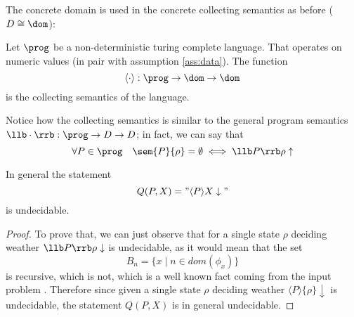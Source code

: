 The concrete domain is used in the concrete collecting semantics as
before (\(D \cong \dom\)):

\begin{definition}\label{def:collecting}
  Let \(\prog\) be a non-deterministic turing complete language. That
  operates on numeric values (in pair with assumption
  \ref{ass:data}). The function \[\langle \cdot \rangle : \prog \to
  \dom \to \dom\] is the collecting semantics of the language.
\end{definition}

Notice how the collecting semantics is similar to the general program
semantics \(\llb \cdot \rrb : \prog \to D \to D\); in fact, we can say
that \[\forall P \in \prog \quad \sem{P} \{\rho\} = \emptyset \iff
\llb P \rrb \rho \uparrow\]

\begin{lemma}\label{le:collectingundec}
  In general the statement \[Q(P,X) = "\langle P \rangle X
  \downarrow"\] is undecidable.
\end{lemma}

\begin{proof}
  To prove that, we can just observe that for a single state \(\rho\)
  deciding weather \(\llb P \rrb \rho \downarrow\) is undecidable, as
  it would mean that the set \[B_n = \{x \mid n \in dom(\phi_x)\}\] is
  recursive, which is not, which is a well known fact coming from the
  input problem \cite[p.~104]{cutland1980computability}. Therefore
  since given a single state \(\rho\) deciding weather \(\langle P
  \rangle\{\rho\}\downarrow\) is undecidable, the statement \(Q(P,X)\)
  is in general undecidable.
\end{proof}

